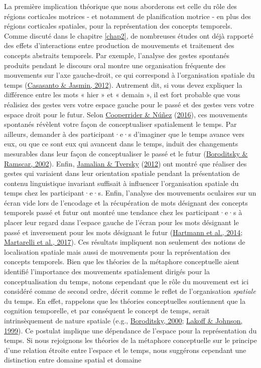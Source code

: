 \documentclass[
  a4paper,12pt,twoside,onecolumn,openright,final,oldfontcommands]{memoir}
\begin{document}
La première implication théorique que nous aborderons est celle du rôle des régions corticales motrices - et notamment de planification motrice - en plus des régions corticales spatiales, pour la représentation des concepts temporels. Comme discuté dans le chapitre \ref{chap2}, de nombreuses études ont déjà rapporté des effets d'interactions entre production de mouvements et traitement des concepts abstraits temporels. Par exemple, l'analyse des gestes spontanés produits pendant le discours oral montre une organisation fréquente des mouvements sur l'axe gauche-droit, ce qui correspond à l'organisation spatiale du temps (\protect\hyperlink{ref-casasanto_hands_2012}{Casasanto \& Jasmin, 2012}). Autrement dit, si vous devez expliquer la différence entre les mots « hier » et « demain », il est fort probable que vous réalisiez des gestes vers votre espace gauche pour le passé et des gestes vers votre espace droit pour le futur. Selon \protect\hyperlink{ref-cooperrider_how_2016}{Cooperrider \& Núñez} (\protect\hyperlink{ref-cooperrider_how_2016}{2016}), ces mouvements spontanés révèlent votre façon de conceptualiser spatialement le temps. Par ailleurs, demander à des participant·e·s d'imaginer que le temps avance vers eux, ou que ce sont eux qui avancent dans le temps, induit des changements mesurables dans leur façon de conceptualiser le passé et le futur (\protect\hyperlink{ref-boroditsky_roles_2002}{Boroditsky \& Ramscar, 2002}). Enfin, \protect\hyperlink{ref-jamalian_gestures_2012}{Jamalian \& Tversky} (\protect\hyperlink{ref-jamalian_gestures_2012}{2012}) ont montré que réaliser des gestes qui variaient dans leur orientation spatiale pendant la présentation de contenu linguistique invariant suffisait à influencer l'organisation spatiale du temps chez les participant·e·s. Enfin, l'analyse des mouvements oculaires sur un écran vide lors de l'encodage et la récupération de mots désignant des concepts temporels passé et futur ont montré une tendance chez les participant·e·s à placer leur regard dans l'espace gauche de l'écran pour les mots désignant le passé et inversement pour les mots désignant le futur (\protect\hyperlink{ref-hartmann_eye_2014-1}{Hartmann et al., 2014}; \protect\hyperlink{ref-martarelli_time_2017}{Martarelli et al., 2017}). Ces résultats impliquent non seulement des notions de localisation spatiale mais aussi de mouvements pour la représentation des concepts temporels. Bien que les théories de la métaphore conceptuelle aient identifié l'importance des mouvements spatialement dirigés pour la conceptualisation du temps, notons cependant que le rôle du mouvement est ici considéré comme de second ordre, décrit comme le reflet de l'organisation \emph{spatiale} du temps. En effet, rappelons que les théories conceptuelles soutiennent que la cognition temporelle, et par conséquent le concept de temps, serait intrinsèquement de nature spatiale (e.g., \protect\hyperlink{ref-boroditsky_metaphoric_2000}{Boroditsky, 2000}; \protect\hyperlink{ref-lakoff_philosophy_1999}{Lakoff \& Johnson, 1999}). Ce postulat implique une dépendance de l'espace pour la représentation du temps. Si nous rejoignons les théories de la métaphore conceptuelle sur le principe d'une relation étroite entre l'espace et le temps, nous suggérons cependant une distinction entre domaine spatial et domaine 
\end{document}
